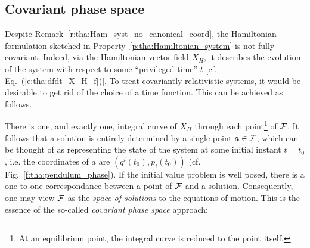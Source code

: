 \subsection{Covariant phase space}

Despite Remark~\ref{r:tha:Ham_syst_no_canonical_coord}, the Hamiltonian formulation sketched in
Property~\ref{p:tha:Hamiltonian_system} is not fully covariant.
Indeed, via the Hamiltonian
vector field $X_H$, it describes the evolution of the system with
respect to some ``privileged time'' $t$ [cf. Eq.~(\ref{e:tha:dfdt_X_H_f})].
To treat covariantly relativistic systems, it would be desirable to get
rid of the choice of a time function. This can be achieved as follows.

There is one, and exactly one,
integral curve of $X_H$ through each point\footnote{At an equilibrium point, the
integral curve is reduced to the point itself.} of $\mathcal{F}$.
It follows that a solution is entirely determined by a single point $a\in\mathcal{F}$,
which can be thought of as representing the state of the system at some initial
instant $t=t_0$, i.e. the coordinates of $a$ are $(q^i(t_0),p_i(t_0))$
(cf. Fig.~\ref{f:tha:pendulum_phase}).
If the initial value problem is well posed, there is a one-to-one
correspondance between a point of $\mathcal{F}$ and a solution.
Consequently, one may view $\mathcal{F}$ as the \emph{space of solutions}
to the equations of motion.
This is the essence of the
so-called \emph{covariant phase space} approach:

